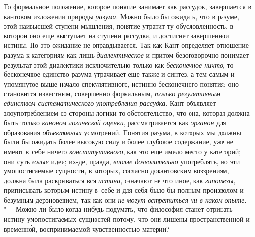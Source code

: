 То формальное положение, которое понятие занимает как
рассудок, завершается в кантовом изложении природы
{\em разума}. Можно было
бы ожидать, что в разуме, этой наивысшей ступени мышления, понятие утратит
ту обусловленность, в которой оно еще выступает на ступени рассудка, и
достигнет завершенной истины. Но это ожидание не оправдывается. Так как
Кант определяет отношение разума к категориям как лишь
{\em диалектическое} и
притом безоговорочно понимает результат этой диалектики исключительно
только как {\em бесконечное ничто},
то бесконечное единство разума утрачивает еще
также и синтез, а тем самым и упомянутое выше начало
спекулятивного, истинно бесконечного понятия; оно становится известным,
совершенно формальным, {\em только
регулятивным единством систематического употребления рассудка}.
Кант объявляет злоупотреблением со стороны логики то
обстоятельство, что она, которая должна быть только
{\em каноном логической оценки},
рассматривается как
{\em органон} для
образования {\em объективных}
усмотрений. Понятия разума, в которых мы должны были бы
ожидать более высокую силу и более глубокое содержание, уже не имеют в~себе
ничего {\em конститутивного},
как это еще имело место у категорий; они суть
{\em голые} идеи; их-де,
правда, {\em вполне дозволительно}
употреблять, но эти умопостигаемые сущности, в которых,
согласно докантовским воззрениям, должна была раскрываться вся
{\em истина}, означают не
что иное, как {\em гипотезы},
приписывать которым истину в~себе и для себя было бы полным
произволом и безумным дерзновением, так как они
{\em не могут встретиться ни в каком
опыте}. "--- Можно ли было когда-нибудь подумать, что философия
станет отрицать истину умопостигаемых сущностей потому, что они лишены
пространственной и временн\'{о}й, воспринимаемой чувственностью материи?

